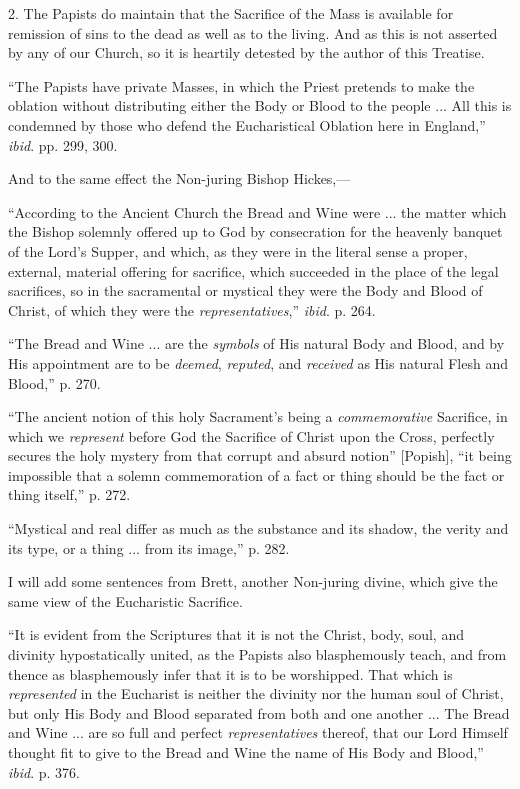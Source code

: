 2. The Papists do maintain that the Sacrifice of the Mass is
available for remission of sins to the dead as well as to the living.
And as this is not asserted by any of our Church, so it is heartily
detested by the author of this Treatise.

``The Papists have private Masses, in which the Priest pretends
to make the oblation without distributing either the Body or Blood to
the people ... All this is condemned by those who defend the
Eucharistical Oblation here in England,'' \emph{ibid}. pp. 299,
300.

And to the same effect the Non-juring Bishop Hickes,—

``According to the Ancient Church the Bread and Wine were ...
the matter which the Bishop solemnly offered up to God by consecration
for the heavenly banquet of the Lord's Supper, and which, as they were
in the literal sense a proper, external, material offering for
sacrifice, which succeeded in the place of the legal sacrifices, so in
the sacramental or mystical they were the Body and Blood of Christ, of
which they were the \emph{representatives},'' \emph{ibid}. p. 264.

``The Bread and Wine ... are the \emph{symbols} of His natural
Body and Blood, and by His appointment are to be \emph{deemed}, \emph{reputed},
and \emph{received} as His natural Flesh and Blood,'' p. 270.

``The ancient notion of this holy Sacrament's being a \emph{commemorative}
Sacrifice, in which we \emph{represent} before God the Sacrifice of
Christ upon the Cross, perfectly secures the holy mystery from that
corrupt and absurd notion'' [Popish], ``it being impossible
that a solemn commemoration of a fact or thing should be the fact or
thing itself,'' p. 272.

``Mystical and real differ as much as the substance and its
shadow, the verity and its type, or a thing ... from its image,''
p. 282.

I will add some sentences from Brett, another Non-juring divine,
which give the same view of the Eucharistic Sacrifice.

``It is evident from the Scriptures that it is not the Christ,
body, soul, and divinity hypostatically united, as the Papists also
blasphemously teach, and from thence as blasphemously infer that it is
to be worshipped. That which is \emph{represented} in the Eucharist is
neither the divinity nor the human soul of Christ, but only His Body
and Blood separated from both and one another ... The Bread and Wine
... are so full and perfect \emph{representatives} thereof, that our
Lord Himself thought fit to give to the Bread and Wine the name of His
Body and Blood,'' \emph{ibid}. p. 376.

